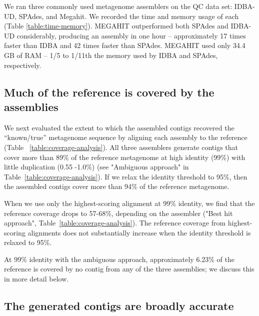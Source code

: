 \documentclass[10pt,a4paper,twocolumn]{article}
\begin{document}
We ran three commonly used metagenome assemblers on the QC data set:
IDBA-UD, SPAdes, and Megahit. We recorded the time and memory usage of
each (Table \ref{table:time-memory}).  MEGAHIT outperformed both
SPAdes and IDBA-UD considerably, producing an assembly in one hour --
approximately 17 times faster than IDBA and 42 times faster than
SPAdes.  MEGAHIT used only 34.4 GB of RAM -- 1/5 to 1/11th
the memory used by IDBA and SPAdes, respectively.

\subsection*{Much of the reference is covered by the assemblies}

We next evaluated the extent to which the assembled contigs recovered the
``known/true'' metagenome sequence by aligning each assembly to the
reference (Table ~\ref{table:coverage-analysis}).  All three
assemblers generate contigs that cover more than 89\% of the reference
metagenome at high identity (99\%) with little duplication
(0.55 -1.0\%) (see "Ambiguous approach" in
Table~\ref{table:coverage-analysis}).  If we relax the identity
threshold to 95\%, then the assembled contigs cover more than 94\% of
the reference metagenome.


When we use only the highest-scoring alignment at 99\% identity, we
find that the reference coverage drops to 57-68\%, depending on the
assembler ("Best hit approach",
Table~\ref{table:coverage-analysis}). The reference coverage from
highest-scoring alignments does not substantially increase when the
identity threshold is relaxed to 95\%.

At 99\% identity with the ambiguous approach, approximately 6.23\% of
the reference is covered by no contig from any of the three
assemblies; we discuss this in more detail below.

\subsection*{The generated contigs are broadly accurate} 
\end{document}
